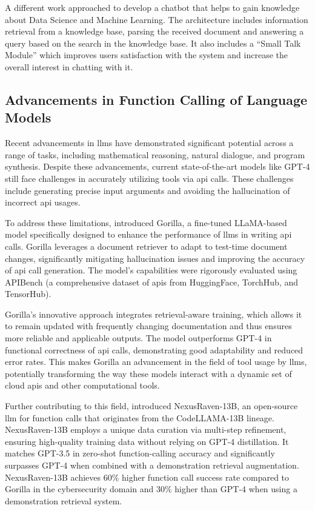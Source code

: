 A different work \cite{carlander-reuterfelt_jaicob_2020} approached to develop a chatbot that helps to gain knowledge about Data Science and Machine Learning.
The architecture includes information retrieval from a knowledge base, parsing the received document and answering a query based on the search in the knowledge base.
It also includes a ``Small Talk Module'' which improves users satisfaction with the system and increase the overall interest in chatting with it.

\subsection{Advancements in Function Calling of Language Models}

Recent advancements in \glspl{llm} have demonstrated significant potential across a range of tasks, including mathematical reasoning, natural dialogue, and program synthesis. Despite these advancements, current state-of-the-art models like GPT-4 still face challenges in accurately utilizing tools via \gls{api} calls. These challenges include generating precise input arguments and avoiding the hallucination of incorrect \gls{api} usages.

To address these limitations, \citet{patil2023gorillalargelanguagemodel} introduced Gorilla, a fine-tuned LLaMA-based model specifically designed to enhance the performance of \glspl{llm} in writing \gls{api} calls. Gorilla leverages a document retriever to adapt to test-time document changes, significantly mitigating hallucination issues and improving the accuracy of \gls{api} call generation. The model's capabilities were rigorously evaluated using APIBench (a comprehensive dataset of \glspl{api} from HuggingFace, TorchHub, and TensorHub).

Gorilla's innovative approach integrates retrieval-aware training, which allows it to remain updated with frequently changing documentation and thus ensures more reliable and applicable outputs. The model outperforms GPT-4 in functional correctness of \gls{api} calls, demonstrating good adaptability and reduced error rates. This makes Gorilla an advancement in the field of tool usage by \glspl{llm}, potentially transforming the way these models interact with a dynamic set of cloud \glspl{api} and other computational tools.

Further contributing to this field, \citet{srinivasan2023nexusraven} introduced NexusRaven-13B, an open-source \gls{llm} for function calls that originates from the CodeLLAMA-13B lineage. NexusRaven-13B employs a unique data curation via multi-step refinement, ensuring high-quality training data without relying on GPT-4 distillation. It matches GPT-3.5 in zero-shot function-calling accuracy and significantly surpasses GPT-4 when combined with a demonstration retrieval augmentation. NexusRaven-13B achieves 60\% higher function call success rate compared to Gorilla in the cybersecurity domain and 30\% higher than GPT-4 when using a demonstration retrieval system.


